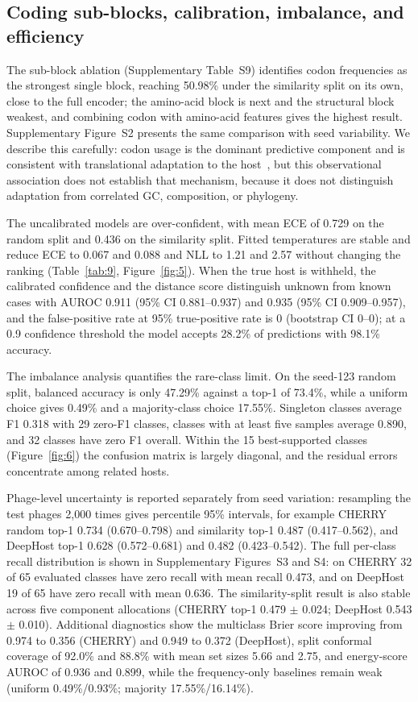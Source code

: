 \documentclass[utf8]{FrontiersinVancouver}
\begin{document}
\subsection{Coding sub-blocks, calibration, imbalance, and efficiency}

The sub-block ablation (Supplementary Table~S9) identifies codon frequencies as the strongest single block, reaching 50.98\% under the similarity split on its own, close to the full encoder; the amino-acid block is next and the structural block weakest, and combining codon with amino-acid features gives the highest result. Supplementary Figure~S2 presents the same comparison with seed variability. We describe this carefully: codon usage is the dominant predictive component and is consistent with translational adaptation to the host~\citep{sharp1987codon}, but this observational association does not establish that mechanism, because it does not distinguish adaptation from correlated GC, composition, or phylogeny.

The uncalibrated models are over-confident, with mean ECE of 0.729 on the random split and 0.436 on the similarity split. Fitted temperatures are stable and reduce ECE to 0.067 and 0.088 and NLL to 1.21 and 2.57 without changing the ranking (Table~\ref{tab:9}, Figure~\ref{fig:5}). When the true host is withheld, the calibrated confidence and the distance score distinguish unknown from known cases with AUROC 0.911 (95\% CI 0.881--0.937) and 0.935 (95\% CI 0.909--0.957), and the false-positive rate at 95\% true-positive rate is 0 (bootstrap CI 0--0); at a 0.9 confidence threshold the model accepts 28.2\% of predictions with 98.1\% accuracy.

The imbalance analysis quantifies the rare-class limit. On the seed-123 random split, balanced accuracy is only 47.29\% against a top-1 of 73.4\%, while a uniform choice gives 0.49\% and a majority-class choice 17.55\%. Singleton classes average F1 0.318 with 29 zero-F1 classes, classes with at least five samples average 0.890, and 32 classes have zero F1 overall. Within the 15 best-supported classes (Figure~\ref{fig:6}) the confusion matrix is largely diagonal, and the residual errors concentrate among related hosts.

Phage-level uncertainty is reported separately from seed variation: resampling the test phages 2,000 times gives percentile 95\% intervals, for example CHERRY random top-1 0.734 (0.670--0.798) and similarity top-1 0.487 (0.417--0.562), and DeepHost top-1 0.628 (0.572--0.681) and 0.482 (0.423--0.542). The full per-class recall distribution is shown in Supplementary Figures~S3 and S4: on CHERRY 32 of 65 evaluated classes have zero recall with mean recall 0.473, and on DeepHost 19 of 65 have zero recall with mean 0.636. The similarity-split result is also stable across five component allocations (CHERRY top-1 0.479 $\pm$ 0.024; DeepHost 0.543 $\pm$ 0.010). Additional diagnostics show the multiclass Brier score improving from 0.974 to 0.356 (CHERRY) and 0.949 to 0.372 (DeepHost), split conformal coverage of 92.0\% and 88.8\% with mean set sizes 5.66 and 2.75, and energy-score AUROC of 0.936 and 0.899, while the frequency-only baselines remain weak (uniform 0.49\%/0.93\%; majority 17.55\%/16.14\%).
\end{document}
